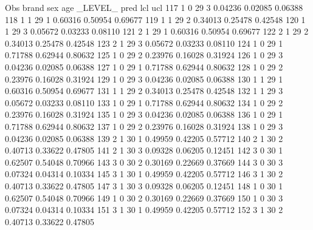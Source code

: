 \documentclass{article}
\begin{document}
\begin{Woutput}
 Obs    brand    sex    age    _LEVEL_      pred       lcl        ucl
 117      1       0      29       3       0.04236    0.02085    0.06388
 118      1       1      29       1       0.60316    0.50954    0.69677
 119      1       1      29       2       0.34013    0.25478    0.42548
 120      1       1      29       3       0.05672    0.03233    0.08110
 121      2       1      29       1       0.60316    0.50954    0.69677
 122      2       1      29       2       0.34013    0.25478    0.42548
 123      2       1      29       3       0.05672    0.03233    0.08110
 124      1       0      29       1       0.71788    0.62944    0.80632
 125      1       0      29       2       0.23976    0.16028    0.31924
 126      1       0      29       3       0.04236    0.02085    0.06388
 127      1       0      29       1       0.71788    0.62944    0.80632
 128      1       0      29       2       0.23976    0.16028    0.31924
 129      1       0      29       3       0.04236    0.02085    0.06388
 130      1       1      29       1       0.60316    0.50954    0.69677
 131      1       1      29       2       0.34013    0.25478    0.42548
 132      1       1      29       3       0.05672    0.03233    0.08110
 133      1       0      29       1       0.71788    0.62944    0.80632
 134      1       0      29       2       0.23976    0.16028    0.31924
 135      1       0      29       3       0.04236    0.02085    0.06388
 136      1       0      29       1       0.71788    0.62944    0.80632
 137      1       0      29       2       0.23976    0.16028    0.31924
 138      1       0      29       3       0.04236    0.02085    0.06388
 139      2       1      30       1       0.49959    0.42205    0.57712
 140      2       1      30       2       0.40713    0.33622    0.47805
 141      2       1      30       3       0.09328    0.06205    0.12451
 142      3       0      30       1       0.62507    0.54048    0.70966
 143      3       0      30       2       0.30169    0.22669    0.37669
 144      3       0      30       3       0.07324    0.04314    0.10334
 145      3       1      30       1       0.49959    0.42205    0.57712
 146      3       1      30       2       0.40713    0.33622    0.47805
 147      3       1      30       3       0.09328    0.06205    0.12451
 148      1       0      30       1       0.62507    0.54048    0.70966
 149      1       0      30       2       0.30169    0.22669    0.37669
 150      1       0      30       3       0.07324    0.04314    0.10334
 151      3       1      30       1       0.49959    0.42205    0.57712
 152      3       1      30       2       0.40713    0.33622    0.47805

\end{Woutput}
\end{document}
